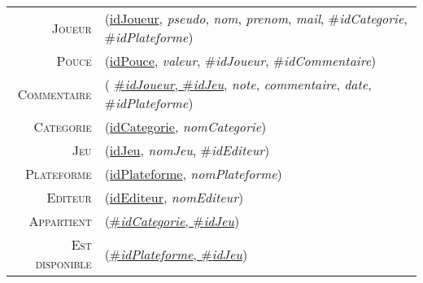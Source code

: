 \documentclass{article}
\newenvironment{mld}
{\par\begin{minipage}{\linewidth}\begin{tabular}{rp{\linewidth}}}
{\end{tabular}\end{minipage}\par}
\newcommand{\relat}[1]{\textsc{#1}}
\newcommand{\attr}[1]{\emph{#1}}
\newcommand{\prim}[1]{\uline{#1}}
\newcommand{\foreign}[1]{\#\textsl{#1}}
\begin{document}
\begin{mld}
  \relat{Joueur} & (\prim{idJoueur}, \attr{pseudo}, \attr{nom}, \attr{prenom}, \attr{mail}, \foreign{idCategorie}, \foreign{idPlateforme})\\
  \relat{Pouce} & (\prim{idPouce}, \attr{valeur}, \foreign{idJoueur}, \foreign{idCommentaire})\\
  \relat{Commentaire} & ( \prim{\foreign{idJoueur}, \foreign{idJeu}}, \attr{note}, \attr{commentaire}, \attr{date}, \foreign{idPlateforme})\\
  \relat{Categorie} & (\prim{idCategorie}, \attr{nomCategorie})\\
  \relat{Jeu} & (\prim{idJeu}, \attr{nomJeu}, \foreign{idEditeur})\\
  \relat{Plateforme} & (\prim{idPlateforme}, \attr{nomPlateforme})\\
  \relat{Editeur} & (\prim{idEditeur}, \attr{nomEditeur})\\
  \relat{Appartient} & (\prim{\foreign{idCategorie}, \foreign{idJeu}})\\
  \relat{Est disponible} & (\prim{\foreign{idPlateforme}, \foreign{idJeu}})\\
\end{mld}
\end{document}
